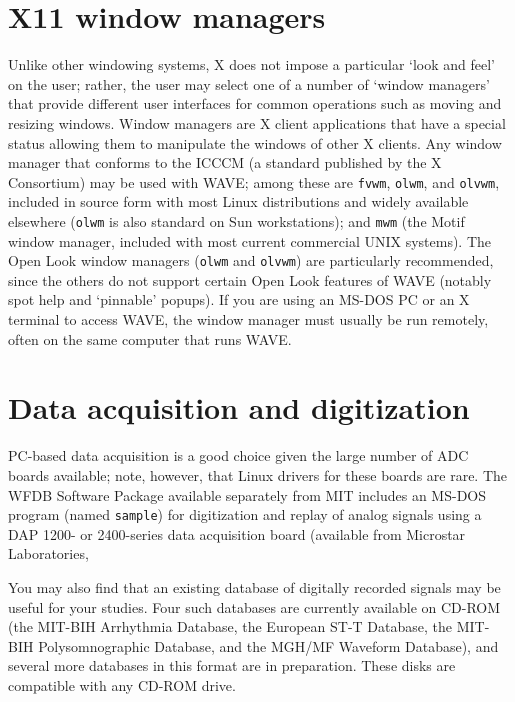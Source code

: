 \documentclass[twoside]{book}
\newcommand{\WAVE}{{\sf WAVE}\xspace}
\begin{document}
\section{X11 window managers}
Unlike other windowing systems, X does not impose a particular `look and feel'
on the user; rather, the user may select one of a number of `window managers'
that provide different user interfaces for common operations such as moving and
resizing windows.  Window managers are X client applications that have a
special status allowing them to manipulate the windows of other X clients.  Any
window manager that conforms to the ICCCM (a standard published by the X
Consortium) may be used with \WAVE{}; among these are {\tt fvwm},
{\tt olwm}, and {\tt olvwm},
included in source form with most Linux distributions
and widely available elsewhere ({\tt olwm} is also standard on Sun
workstations);  and {\tt mwm} (the Motif window manager, included with most
current commercial UNIX systems).  The Open Look window managers ({\tt olwm}
and {\tt olvwm}) are particularly recommended, since the others do not support
certain Open Look features of \WAVE{} (notably spot help and `pinnable'
popups).  If you
are using an MS-DOS PC or an X terminal to access \WAVE{}, the window
manager must usually be run remotely, often on the same computer that runs
\WAVE{}.

\section{Data acquisition and digitization}
\label{sec:adc-boards}
PC-based data acquisition is a good choice given the large number of ADC boards
available;  note, however, that Linux drivers for these boards are rare.
The WFDB Software Package available separately from MIT includes an MS-DOS
program (named {\tt sample}) for digitization and replay of analog signals
using a DAP 1200- or 2400-series data acquisition board (available from
Microstar Laboratories,

You may also find that an existing database of digitally recorded signals may
be useful for your studies.  Four such databases are currently available on
CD-ROM (the MIT-BIH Arrhythmia Database, the European ST-T Database, the
MIT-BIH Polysomnographic Database, and the MGH/MF Waveform Database), and
several more databases in this format are in preparation.  These disks are
compatible with any CD-ROM drive.
\end{document}
